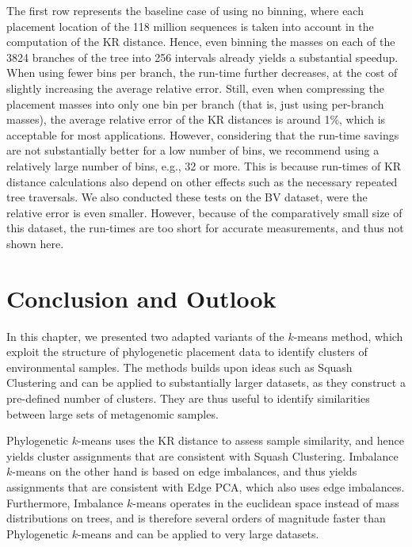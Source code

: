 The first row represents the baseline case of using no binning,
where each placement location of the \num{118} million sequences
is taken into account in the computation of the KR distance.
Hence, even binning the masses on each of the \num{3 824} branches of the tree into \num{256} intervals
already yields a substantial speedup.
When using fewer bins per branch, the run-time further decreases,
at the cost of slightly increasing the average relative error.
Still, even when compressing the placement masses into only one bin per branch (that is, just using per-branch masses),
the average relative error of the KR distances is around 1\%, which is acceptable for most applications.
However, considering that the run-time savings are not substantially better for a low number of bins,
we recommend using a relatively large number of bins, e.g., \num{32} or more.
This is because run-times of KR distance calculations also depend on other effects
such as the necessary repeated tree traversals.
We also conducted these tests on the \ac{BV} dataset, were the relative error is even smaller.
However, because of the comparatively small size of this dataset, the run-times are too short for accurate measurements,
and thus not shown here.


\section{Conclusion and Outlook}
\label{ch:Clustering:sec:ConclusionOutlook}

In this chapter, we presented two adapted variants of the $k$-means method,
which exploit the structure of phylogenetic placement data to identify clusters of environmental samples.
The methods builds upon ideas such as Squash Clustering and can be applied to substantially larger datasets,
as they construct a pre-defined number of clusters.
They are thus useful to identify similarities between large sets of metagenomic samples.

Phylogenetic $k$-means uses the KR distance to assess sample similarity,
and hence yields cluster assignments that are consistent with Squash Clustering.
Imbalance $k$-means on the other hand is based on edge imbalances,
and thus yields assignments that are consistent with Edge PCA, which also uses edge imbalances.
Furthermore, Imbalance $k$-means operates in the euclidean space instead of mass distributions on trees,
and is therefore several orders of magnitude faster than Phylogenetic $k$-means
and can be applied to very large datasets.

